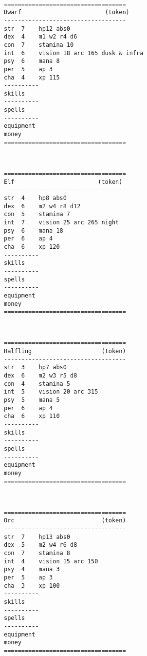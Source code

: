 \

\pagebreak[1]
\tiny \begin{samepage} \begin{verbatim}
===================================
Dwarf                        (token)
-----------------------------------
str  7    hp12 abs0
dex  4    m1 w2 r4 d6
con  7    stamina 10
int  6    vision 18 arc 165 dusk & infra
psy  6    mana 8
per  5    ap 3
cha  4    xp 115
----------
skills
----------
spells
----------
equipment
money
===================================
\end{verbatim} \end{samepage} \normalsize

\

\pagebreak[1]
\tiny \begin{samepage} \begin{verbatim}
===================================
Elf                        (token)
-----------------------------------
str  4    hp8 abs0
dex  6    m2 w4 r8 d12
con  5    stamina 7
int  7    vision 25 arc 265 night
psy  6    mana 18
per  6    ap 4
cha  6    xp 120
----------
skills
----------
spells
----------
equipment
money
===================================
\end{verbatim} \end{samepage} \normalsize

\

\pagebreak[1]
\tiny \begin{samepage} \begin{verbatim}
===================================
Halfling                    (token)
-----------------------------------
str  3    hp7 abs0
dex  6    m2 w3 r5 d8
con  4    stamina 5
int  5    vision 20 arc 315
psy  5    mana 5
per  6    ap 4
cha  6    xp 110
----------
skills
----------
spells
----------
equipment
money
===================================
\end{verbatim} \end{samepage} \normalsize

\


\pagebreak[1]
\tiny \begin{samepage} \begin{verbatim}
===================================
Orc                         (token)
-----------------------------------
str  7    hp13 abs0
dex  5    m2 w4 r6 d8
con  7    stamina 8
int  4    vision 15 arc 150
psy  4    mana 3
per  5    ap 3
cha  3    xp 100
----------
skills
----------
spells
----------
equipment
money
===================================
\end{verbatim} \end{samepage} \normalsize

